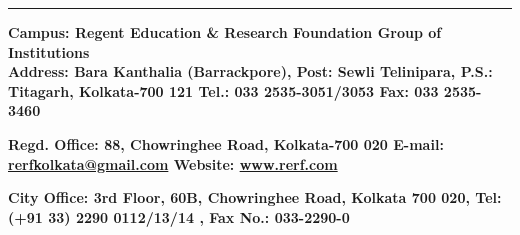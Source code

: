 \documentclass[12pt,a4paper]{report}
\begin{document}
\begin{center}
            \vfill %
            \vspace{5pt}
            \hrule %
          
            \vspace{5pt}
            \centering
            {\scriptsize \textbf{Campus: Regent Education \& Research Foundation Group of Institutions}\\}
            {\tiny \textbf{Address: Bara Kanthalia (Barrackpore), Post: Sewli Telinipara, P.S.: Titagarh, Kolkata-700 121 Tel.: 033 2535-3051/3053 Fax: 033 2535-3460}\\}
            
            {\tiny \textbf{Regd. Office: 88, Chowringhee Road, Kolkata-700 020 E-mail: \underline{rerfkolkata@gmail.com} Website: \underline{www.rerf.com}}\\}
            
            {\tiny \textbf{City Office: 3rd Floor, 60B, Chowringhee Road, Kolkata 700 020, Tel: (+91 33) 2290 0112/13/14 , Fax No.: 033-2290-0}}
            
\end{center}
\end{document}
